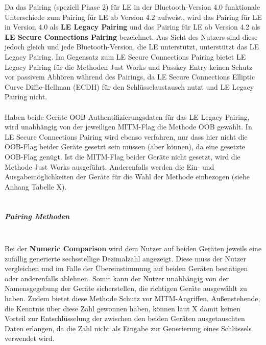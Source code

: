 Da das Pairing (speziell Phase 2) für LE in der Bluetooth-Version 4.0 funktionale Unterschiede zum Pairing für LE ab Version 4.2 aufweist, wird das Pairing für LE in Version 4.0 als \textbf{LE Legacy Pairing} und das Pairing für LE ab Version 4.2 als \textbf{LE Secure Connections Pairing} bezeichnet. Aus Sicht des Nutzers sind diese jedoch gleich und jede Bluetooth-Version, die LE unterstützt, unterstützt das LE Legacy Pairing. Im Gegensatz zum LE Secure Connections Pairing bietet LE Legacy Pairing für die Methoden Just Works und Passkey Entry keinen Schutz vor passivem Abhören während des Pairings, da LE Secure Connections Elliptic Curve Diffie-Hellman (ECDH) für den Schlüsselaustausch nutzt und LE Legacy Pairing nicht.\\\\

Haben beide Geräte OOB-Authentifizierungsdaten für das LE Legacy Pairing, wird unabhängig von der jeweiligen MITM-Flag die Methode OOB gewählt. In LE Secure Connections Pairing wird ebenso verfahren, nur dass hier nicht die OOB-Flag beider Geräte gesetzt sein müssen (aber können), da eine gesetzte OOB-Flag genügt. Ist die MITM-Flag beider Geräte nicht gesetzt, wird die Methode Just Works ausgeführt. Anderenfalls werden die Ein- und Ausgabemöglichkeiten der Geräte für die Wahl der Methode einbezogen (siehe Anhang Tabelle X).\\\\



\subparagraph{Pairing Methoden} \mbox{} \vspace{0.2cm} \\

Bei der \textbf{Numeric Comparison} wird dem Nutzer auf beiden Geräten jeweils eine zufällig generierte sechsstellige Dezimalzahl angezeigt. Diese muss der Nutzer vergleichen und im Falle der Übereinstimmung auf beiden Geräten bestätigen oder anderenfalls ablehnen. Somit kann der Nutzer unabhängig von der Namensgegebung der Geräte sicherstellen, die richtigen Geräte ausgewählt zu haben. Zudem bietet diese Methode Schutz vor MITM-Angriffen. Außenstehende, die Kenntnis über diese Zahl gewonnen haben, können laut X
damit keinen Vorteil zur Entschlüsselung der zwischen den beiden Geräten ausgetauschten Daten erlangen, da die Zahl nicht als Eingabe zur Generierung eines Schlüssels verwendet wird.

